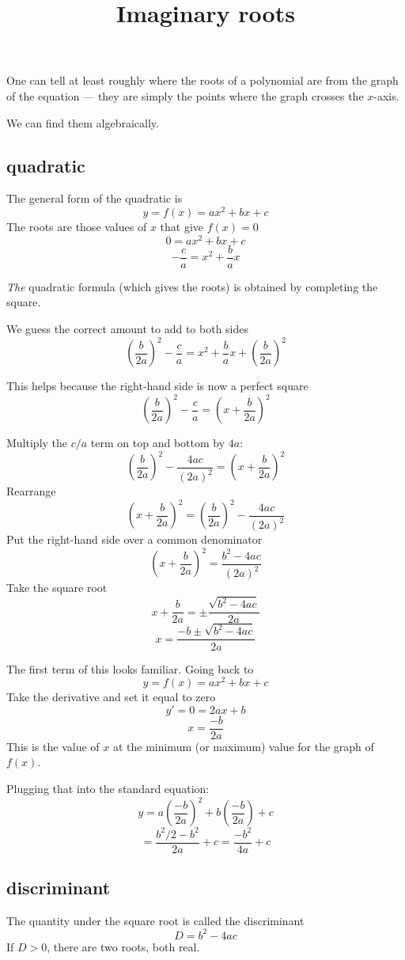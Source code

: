 \documentclass[11pt, oneside]{article}
\title{Imaginary roots}
\date{}
\begin{document}
\maketitle
\Large
One can tell at least roughly where the roots of a polynomial are from the graph of the equation --- they are simply the points where the graph crosses the $x$-axis.

We can find them algebraically.

\subsection*{quadratic}
The general form of the quadratic is
\[ y = f(x) = ax^2 + bx + c \]
The roots are those values of $x$ that give $f(x) = 0$
\[ 0 = ax^2 + bx + c \]
\[ - \frac{c}{a} = x^2 + \frac{b}{a}x \]

\emph{The} quadratic formula (which gives the roots) is obtained by completing the square.

We guess the correct amount to add to both sides
\[ (\frac{b}{2a})^2 - \frac{c}{a} = x^2 + \frac{b}{a}x + (\frac{b}{2a})^2 \]

This helps because the right-hand side is now a perfect square
\[ (\frac{b}{2a})^2 - \frac{c}{a} = (x + \frac{b}{2a})^2 \]

Multiply the $c/a$ term on top and bottom by $4a$:
\[ (\frac{b}{2a})^2 - \frac{4ac}{(2a)^2}  = (x + \frac{b}{2a})^2 \]
Rearrange
\[ (x + \frac{b}{2a})^2 = (\frac{b}{2a})^2 - \frac{4ac}{(2a)^2}  \]
Put the right-hand side over a common denominator
\[ (x + \frac{b}{2a})^2 = \frac{b^2 - 4ac}{(2a)^2} \]
Take the square root
\[ x + \frac{b}{2a} = \pm \frac{\sqrt{b^2 - 4ac}}{2a}  \]
\[ x = \frac{-b \pm \sqrt{b^2 - 4ac}}{2a} \]

The first term of this looks familiar.  Going back to
\[ y = f(x) = ax^2 + bx + c \]
Take the derivative and set it equal to zero
\[ y' = 0 = 2ax + b \]
\[ x = \frac{-b}{2a} \]
This is the value of $x$ at the minimum (or maximum) value for the graph of $f(x)$.

Plugging that into the standard equation:
\[ y = a(\frac{-b}{2a})^2 + b(\frac{-b}{2a}) + c \]
\[ = \frac{b^2/2 - b^2}{2a} + c = \frac{- b^2}{4a} + c \]

\subsection*{discriminant}
The quantity under the square root is called the discriminant
\[ D = b^2 - 4ac \]
If $D > 0$, there are two roots, both real.
\end{document}
